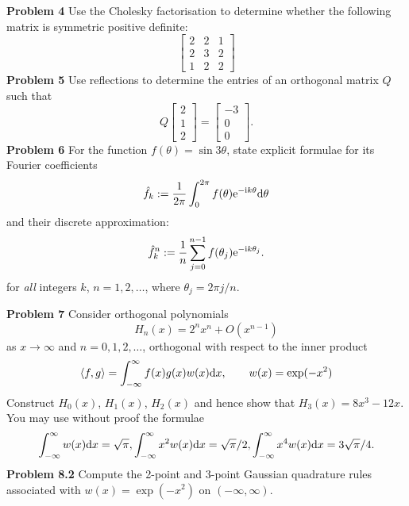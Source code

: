 \documentclass[12pt,a4paper]{article}
\begin{document}
\textbf{Problem 4} Use the Cholesky factorisation to determine whether the following matrix is symmetric positive definite:
\[
\begin{bmatrix} 2 & 2 & 1  \\
2 & 3 & 2\\
1 & 2 & 2
\end{bmatrix}
\]
\textbf{Problem 5} Use reflections to determine the entries of an orthogonal matrix $Q$ such that
\[
Q \begin{bmatrix} 2 \\ 1 \\ 2 \end{bmatrix} =  \begin{bmatrix} -3 \\ 0 \\ 0 \end{bmatrix}.
\]
\textbf{Problem 6} For the function $f(\ensuremath{\theta}) = \sin 3 \ensuremath{\theta}$, state explicit formulae for its Fourier coefficients
\[
\hat f_k := {1 \over 2\ensuremath{\pi}} \int_0^{2\ensuremath{\pi}} f(\ensuremath{\theta}) {\rm e}^{-{\rm i} k \ensuremath{\theta}} {\rm d}\ensuremath{\theta}
\]
and  their discrete approximation:
\[
\hat f_k^n := {1 \over n} \sum_{j=0}^{n-1} f(\ensuremath{\theta}_j) {\rm e}^{-{\rm i} k \ensuremath{\theta}_j}.
\]
for \emph{all} integers $k$, $n = 1,2,\ensuremath{\ldots}$, where $\ensuremath{\theta}_j = 2\ensuremath{\pi} j/n$.

\textbf{Problem 7} Consider orthogonal polynomials
\[
H_n(x) = 2^n x^n + O (x^{n-1})
\]
as $x \ensuremath{\rightarrow} \ensuremath{\infty}$ and $n = 0, 1, 2, \ensuremath{\ldots}$,  orthogonal with respect to the inner product
\[
\langle f, g \rangle = \int_{-\ensuremath{\infty}}^\ensuremath{\infty} f(x) g(x) w(x) {\rm d}x, \qquad w(x) = \exp(-x^2)
\]
Construct $H_0(x)$, $H_1(x)$, $H_2(x)$ and hence show that $H_3(x) = 8x^3-12x$. You may use without proof the formulae
\[
\int_{-\ensuremath{\infty}}^\ensuremath{\infty} w(x) {\rm d}x = \sqrt{\ensuremath{\pi}}, \int_{-\ensuremath{\infty}}^\ensuremath{\infty} x^2 w(x) {\rm d}x = \sqrt{\ensuremath{\pi}}/2,
\int_{-\ensuremath{\infty}}^\ensuremath{\infty} x^4 w(x) {\rm d}x = 3\sqrt{\ensuremath{\pi}}/4.
\]
\textbf{Problem 8.2} Compute the 2-point and 3-point Gaussian quadrature rules associated with $w(x) = \exp(-x^2)$ on $(-\ensuremath{\infty},\ensuremath{\infty})$.
\end{document}
